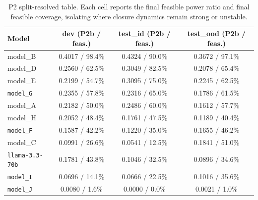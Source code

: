 \begin{table}[t]
\caption{P2 split-resolved table. Each cell reports the final feasible power ratio and final feasible coverage, isolating where closure dynamics remain strong or unstable.}
\label{tab:appendix_p2_split}
\centering
\small
\begin{tabular}{lccc}
\toprule
Model & dev (P2b / feas.) & test\_id (P2b / feas.) & test\_ood (P2b / feas.) \\
\midrule
model_B & 0.4017 / 98.4\% & 0.4324 / 90.0\% & 0.3672 / 97.1\% \\
model_D & 0.2560 / 62.5\% & 0.3049 / 82.5\% & 0.2078 / 65.4\% \\
model_E & 0.2199 / 54.7\% & 0.3095 / 75.0\% & 0.2245 / 62.5\% \\
\texttt{model_G} & 0.2355 / 57.8\% & 0.2316 / 65.0\% & 0.1786 / 61.5\% \\
model_A & 0.2182 / 50.0\% & 0.2486 / 60.0\% & 0.1612 / 57.7\% \\
model_H & 0.2052 / 48.4\% & 0.1761 / 47.5\% & 0.1189 / 40.4\% \\
\texttt{model_F} & 0.1587 / 42.2\% & 0.1220 / 35.0\% & 0.1655 / 46.2\% \\
model_C & 0.0991 / 26.6\% & 0.0541 / 12.5\% & 0.1841 / 51.0\% \\
\texttt{llama-3.3-70b} & 0.1781 / 43.8\% & 0.1046 / 32.5\% & 0.0896 / 34.6\% \\
\texttt{model_I} & 0.0696 / 14.1\% & 0.0666 / 22.5\% & 0.1016 / 35.6\% \\
\texttt{model_J} & 0.0080 / 1.6\% & 0.0000 / 0.0\% & 0.0021 / 1.0\% \\
\bottomrule
\end{tabular}
\end{table}

